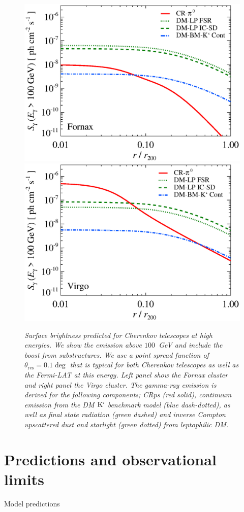 \documentclass[10pt,aps,pra,reprint,amsmath,amsfonts,amssymb,showpacs]{revtex4-1}
\newcommand{\rmn}{\mathrm}
\newcommand{\psf}{\theta_\rmn{res}}
\newcommand{\Kp}{\rmn{K}`}
\begin{document}
\begin{figure}
\begin{minipage}{2.0\columnwidth}
  \includegraphics[width=0.49\columnwidth]{figures/SB.Fornax.v9.SF300.SubMass.elmu.eps}
  \includegraphics[width=0.49\columnwidth]{figures/SB.Virgo.v9.SF300.SubMass.elmu.eps}
\caption{\it Surface brightness predicted for Cherenkov telescopes at
  high energies. We show the emission above $100$~GeV and include the
  boost from substructures. We use a point spread function of
  $\psf=0.1\deg$ that is typical for both Cherenkov
  telescopes as well as the Fermi-LAT at this energy. Left panel show
  the Fornax cluster and right panel the Virgo cluster. The gamma-ray
  emission is derived for the following components; CRps (red solid),
  continuum emission from the DM $\Kp$ benchmark model (blue
  dash-dotted), as well as final state radiation (green dashed) and
  inverse Compton upscattered dust and starlight (green dotted) from
  leptophilic DM.}
 \label{fig:SB_IACTs}
\end{minipage}
\end{figure}



\section{Predictions and observational limits}
Model predictions
\end{document}
